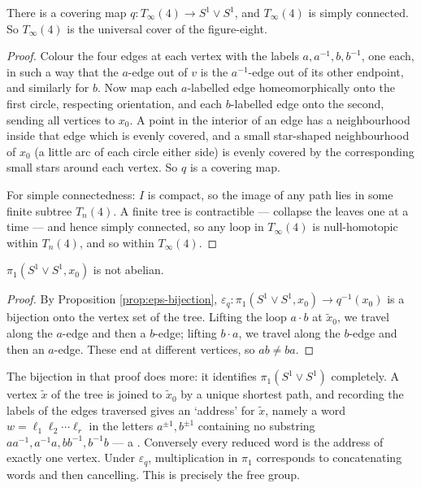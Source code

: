 \documentclass[a4paper]{scrartcl}
\begin{document}
\begin{proposition} \label{prop:tree-cover}
	There is a covering map $q: T_\infty(4) \to S^1 \vee S^1$, and $T_\infty(4)$ is simply connected. So $T_\infty(4)$ is the universal cover of the figure-eight.
\end{proposition}
\begin{proof}
	Colour the four edges at each vertex with the labels $a, a^{-1}, b, b^{-1}$, one each, in such a way that the $a$-edge out of $v$ is the $a^{-1}$-edge out of its other endpoint, and similarly for $b$. Now map each $a$-labelled edge homeomorphically onto the first circle, respecting orientation, and each $b$-labelled edge onto the second, sending all vertices to $x_0$. A point in the interior of an edge has a neighbourhood inside that edge which is evenly covered, and a small star-shaped neighbourhood of $x_0$ (a little arc of each circle either side) is evenly covered by the corresponding small stars around each vertex. So $q$ is a covering map.

	For simple connectedness: $I$ is compact, so the image of any path lies in some finite subtree $T_n(4)$. A finite tree is contractible --- collapse the leaves one at a time --- and hence simply connected, so any loop in $T_\infty(4)$ is null-homotopic within $T_n(4)$, and so within $T_\infty(4)$.
\end{proof}

\begin{corollary} \label{cor:fig8-nonabelian}
	$\pi_1(S^1 \vee S^1, x_0)$ is not abelian.
\end{corollary}
\begin{proof}
	By Proposition \ref{prop:eps-bijection}, $\varepsilon_q: \pi_1(S^1\vee S^1, x_0) \to q^{-1}(x_0)$ is a bijection onto the vertex set of the tree. Lifting the loop $a \cdot b$ at $\tilde x_0$, we travel along the $a$-edge and then a $b$-edge; lifting $b \cdot a$, we travel along the $b$-edge and then an $a$-edge. These end at different vertices, so $ab \neq ba$.
\end{proof}

The bijection in that proof does more: it identifies $\pi_1(S^1 \vee S^1)$ completely. A
vertex $\tilde x$ of the tree is joined to $\tilde x_0$ by a unique shortest path, and
recording the labels of the edges traversed gives an `address' for $\tilde x$, namely a
word $w = \ell_1\ell_2\cdots\ell_r$ in the letters $a^{\pm1}, b^{\pm1}$ containing no
substring $aa^{-1}, a^{-1}a, bb^{-1}, b^{-1}b$ --- a . Conversely
every reduced word is the address of exactly one vertex. Under $\varepsilon_q$,
multiplication in $\pi_1$ corresponds to concatenating words and then cancelling.
This is precisely the free group.
\end{document}
